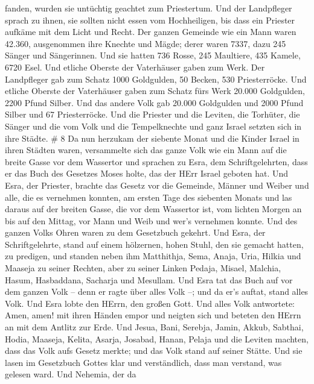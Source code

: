 fanden, wurden sie untüchtig geachtet zum Priestertum.  Und
der Landpfleger sprach zu ihnen, sie sollten nicht essen vom
Hochheiligen, bis dass ein Priester aufkäme mit dem Licht und Recht.
 Der ganzen Gemeinde wie ein Mann waren 42.360,
 ausgenommen ihre Knechte und Mägde; derer waren 7337, dazu
245 Sänger und Sängerinnen.  Und sie hatten 736 Rosse, 245
Maultiere,  435 Kamele, 6720 Esel.  Und
etliche Oberste der Vaterhäuser gaben zum Werk. Der Landpfleger gab zum
Schatz 1000 Goldgulden, 50 Becken, 530 Priesterröcke.  Und
etliche Oberste der Vaterhäuser gaben zum Schatz fürs Werk 20.000
Goldgulden, 2200 Pfund Silber.  Und das andere Volk gab
20.000 Goldgulden und 2000 Pfund Silber und 67 Priesterröcke.
 Und die Priester und die Leviten, die Torhüter, die Sänger
und die vom Volk und die Tempelknechte und ganz Israel setzten sich in
ihre Städte. \# 8  Da nun herzukam der siebente Monat und
die Kinder Israel in ihren Städten waren, versammelte sich das ganze
Volk wie ein Mann auf die breite Gasse vor dem Wassertor und sprachen zu
Esra, dem Schriftgelehrten, dass er das Buch des Gesetzes Moses holte,
das der HErr Israel geboten hat.  Und Esra, der Priester,
brachte das Gesetz vor die Gemeinde, Männer und Weiber und alle, die es
vernehmen konnten, am ersten Tage des siebenten Monats  und
las daraus auf der breiten Gasse, die vor dem Wassertor ist, vom lichten
Morgen an bis auf den Mittag, vor Mann und Weib und wer's vernehmen
konnte. Und des ganzen Volks Ohren waren zu dem Gesetzbuch gekehrt.
 Und Esra, der Schriftgelehrte, stand auf einem hölzernen,
hohen Stuhl, den sie gemacht hatten, zu predigen, und standen neben ihm
Matthithja, Sema, Anaja, Uria, Hilkia und Maaseja zu seiner Rechten,
aber zu seiner Linken Pedaja, Misael, Malchia, Hasum, Hasbaddana,
Sacharja und Mesullam.  Und Esra tat das Buch auf vor dem
ganzen Volk -- denn er ragte über alles Volk --; und da er's auftat,
stand alles Volk.  Und Esra lobte den HErrn, den großen
Gott. Und alles Volk antwortete: Amen, amen! mit ihren Händen empor und
neigten sich und beteten den HErrn an mit dem Antlitz zur Erde.
 Und Jesua, Bani, Serebja, Jamin, Akkub, Sabthai, Hodia,
Maaseja, Kelita, Asarja, Josabad, Hanan, Pelaja und die Leviten machten,
dass das Volk aufs Gesetz merkte; und das Volk stand auf seiner Stätte.
 Und sie lasen im Gesetzbuch Gottes klar und verständlich,
dass man verstand, was gelesen ward.  Und Nehemia, der da
